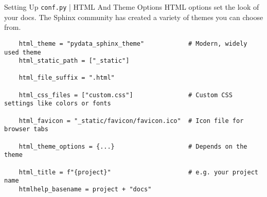 \begin{frame}[fragile]{Setting Up \texttt{conf.py} | HTML And Theme Options}
  HTML options set the look of your docs. The Sphinx community has created a variety of
  themes you can choose from.
  {
  \footnotesize
  \begin{verbatim}
    html_theme = "pydata_sphinx_theme"            # Modern, widely used theme
    html_static_path = ["_static"]

    html_file_suffix = ".html"

    html_css_files = ["custom.css"]               # Custom CSS settings like colors or fonts

    html_favicon = "_static/favicon/favicon.ico"  # Icon file for browser tabs

    html_theme_options = {...}                    # Depends on the theme

    html_title = f"{project}"                     # e.g. your project name
    htmlhelp_basename = project + "docs"
  \end{verbatim}
  }
\end{frame}




